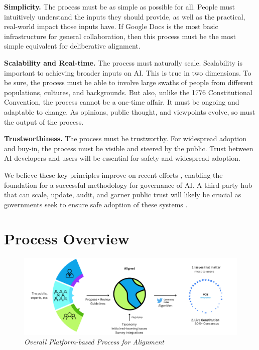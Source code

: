 \documentclass{article}
\begin{document}
\begin{multicols}{2}
\textbf{Simplicity.}
The process must be as simple as possible for all. People must intuitively understand the inputs they should provide, as well as the practical, real-world impact those inputs have. If Google Docs is the most basic infrastructure for general collaboration, then this process must be the most simple equivalent for deliberative alignment.

\textbf{Scalability and Real-time.}
The process must naturally scale. Scalability is important to achieving broader inputs on AI. This is true in two dimensions. To be sure, the process must be able to involve large swaths of people from different populations, cultures, and backgrounds. But also, unlike the 1776 Constitutional Convention, the process cannot be a one-time affair. It must be ongoing and adaptable to change. As opinions, public thought, and viewpoints evolve, so must the output of the process.

\textbf{Trustworthiness.}
The process must be trustworthy. For widespread adoption and buy-in, the process must be visible and steered by the public. Trust between AI developers and users will be essential for safety and widespread adoption.

We believe these key principles improve on recent efforts \cite{collectiveConst, deepmind}, enabling the foundation for a successful methodology for governance of AI. A third-party hub that can scale, update, audit, and garner public trust will likely be crucial as governments seek to ensure safe adoption of these systems \cite{brundage2020toward}.

\section{Process Overview}
\begin{figure}[ht]
    \centering
    \includegraphics[width=\textwidth]{process.png}
    \caption{\textit{Overall Platform-based Process for Alignment}}
    \label{process}
\end{figure}


\end{multicols}
\end{document}
